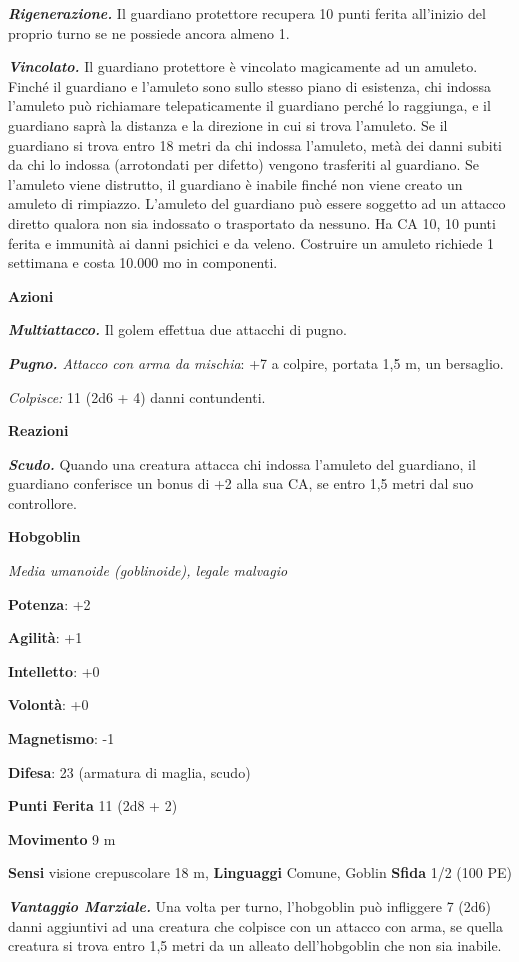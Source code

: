 \begin{multicols}{2}
\emph{\textbf{Rigenerazione.}} Il guardiano protettore recupera 10 punti
ferita all'inizio del proprio turno se ne possiede ancora almeno 1.

\emph{\textbf{Vincolato.}} Il guardiano protettore è vincolato
magicamente ad un amuleto. Finché il guardiano e l'amuleto sono sullo
stesso piano di esistenza, chi indossa l'amuleto può richiamare
telepaticamente il guardiano perché lo raggiunga, e il guardiano saprà
la distanza e la direzione in cui si trova l'amuleto. Se il guardiano si
trova entro 18 metri da chi indossa l'amuleto, metà dei danni subiti da
chi lo indossa (arrotondati per difetto) vengono trasferiti al
guardiano. Se l'amuleto viene distrutto, il guardiano è inabile finché
non viene creato un amuleto di rimpiazzo. L'amuleto del guardiano può
essere soggetto ad un attacco diretto qualora non sia indossato o
trasportato da nessuno. Ha CA 10, 10 punti ferita e immunità ai danni
psichici e da veleno. Costruire un amuleto richiede 1 settimana e costa
10.000 mo in componenti.

\textbf{Azioni}

\emph{\textbf{Multiattacco.}} Il golem effettua due attacchi di pugno.

\emph{\textbf{Pugno.} Attacco con arma da mischia}: +7 a colpire,
portata 1,5 m, un bersaglio.

\emph{Colpisce:} 11 (2d6 + 4) danni contundenti.

\textbf{Reazioni}

\emph{\textbf{Scudo.}} Quando una creatura attacca chi indossa l'amuleto
del guardiano, il guardiano conferisce un bonus di +2 alla sua CA, se
entro 1,5 metri dal suo controllore.

\textbf{Hobgoblin}

\emph{Media umanoide (goblinoide), legale malvagio}

\textbf{Potenza}: +2

\textbf{Agilità}: +1

\textbf{Intelletto}: +0

\textbf{Volontà}: +0

\textbf{Magnetismo}: -1

\textbf{Difesa}: 23 (armatura di maglia, scudo)

\textbf{Punti Ferita} 11 (2d8 + 2)

\textbf{Movimento} 9 m

\textbf{Sensi} visione crepuscolare 18 m, 
\textbf{Linguaggi} Comune, Goblin \textbf{Sfida} 1/2 (100 PE)

\emph{\textbf{Vantaggio Marziale.}} Una volta per turno, l'hobgoblin può
infliggere 7 (2d6) danni aggiuntivi ad una creatura che colpisce con un
attacco con arma, se quella creatura si trova entro 1,5 metri da un
alleato dell'hobgoblin che non sia inabile.


\end{multicols}
